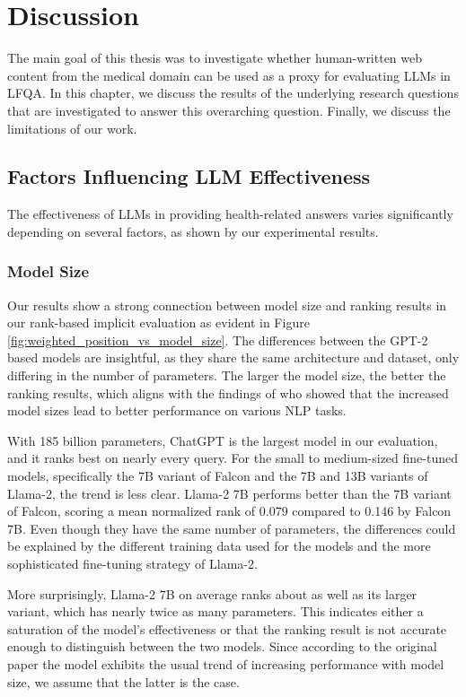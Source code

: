 
\chapter{Discussion}\label{discussion}

The main goal of this thesis was to investigate whether human-written web content from the medical domain can be used as a proxy for evaluating LLMs in LFQA.
In this chapter, we discuss the results of the underlying research questions that are investigated to answer this overarching question.
Finally, we discuss the limitations of our work.

\section{Factors Influencing LLM Effectiveness}

The effectiveness of LLMs in providing health-related answers varies significantly depending on several factors, as shown by our experimental results.

\subsection{Model Size}
Our results show a strong connection between model size and ranking results in our rank-based implicit evaluation as evident in Figure \ref{fig:weighted_position_vs_model_size}. 
The differences between the GPT-2 based models are insightful, as they share the same architecture and dataset, only differing in the number of parameters.
The larger the model size, the better the ranking results, which aligns with the findings of \cite{radford:2019:language} who showed that the increased model sizes lead to better performance on various NLP tasks.

With 185 billion parameters, ChatGPT is the largest model in our evaluation, and it ranks best on nearly every query.
For the small to medium-sized fine-tuned models, specifically the 7B variant of Falcon and the 7B and 13B variants of Llama-2, the trend is less clear.
Llama-2 7B performs better than the 7B variant of Falcon, scoring a mean normalized rank of 0.079 compared to 0.146 by Falcon 7B.
Even though they have the same number of parameters, the differences could be explained by the different training data used for the models and the more sophisticated fine-tuning strategy of Llama-2.

More surprisingly, Llama-2 7B on average ranks about as well as its larger variant, which has nearly twice as many parameters.
This indicates either a saturation of the model's effectiveness or that the ranking result is not accurate enough to distinguish between the two models.
Since according to the original paper \cite{touvron:2023:Llama} the model exhibits the usual trend of increasing performance with model size, we assume that the latter is the case.

